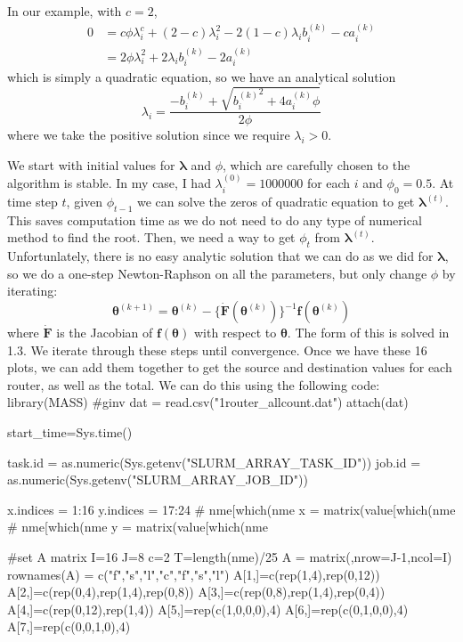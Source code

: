 \documentclass[letterpaper,10pt]{amsart}
\newenvironment{verbatimcode}{\bigskip \scriptsize \verbatim}{\endverbatim \normalsize \bigskip}
\begin{document}
\begin{enumerate}[{1}.1]
In our example, with $c=2$, 
\begin{align*}
0 &= c \phi \lambda_i^c + (2-c)\lambda_i^2 - 2(1-c)\lambda_i b_i^{(k)} - c a_i^{(k)}\\
&= 2 \phi \lambda_i^2 + 2 \lambda_i b_i^{(k)} - 2a_i^{(k)}
\end{align*}
which is simply a quadratic equation, so we have an analytical solution
\[\lambda_i = \frac{-b_i^{(k)} + \sqrt{{b_i^{(k)}}^2 + 4a_i^{(k)} \phi}}{2\phi} \]
where we take the positive solution since we require $\lambda_i>0$.

We start with initial values for $\boldsymbol \lambda$ and $\phi$, which are carefully chosen to the algorithm is stable. In my case, I had $\lambda_i^{(0)} = 1000000$ for each $i$ and $\phi_0=0.5$. At time step $t$, given $\phi_{t-1}$ we can solve the zeros of quadratic equation to get $\boldsymbol \lambda^{(t)}$. This saves computation time as we do not need to do any type of numerical method to find the root. Then, we need a way to get $\phi_t$ from $\boldsymbol \lambda^{(t)}$. Unfortunlately, there is no easy analytic solution that we can do as we did for $\boldsymbol \lambda$, so we do a one-step Newton-Raphson on all the parameters, but only change $\phi$ by iterating:
\[\boldsymbol \theta^{(k+1)} = \boldsymbol \theta^{(k)} - \{\dot{\boldsymbol F}(\boldsymbol \theta^{(k)})\}^{-1} \boldsymbol f(\boldsymbol \theta^{(k)}) \]
where $\dot{\boldsymbol F}$ is the Jacobian of $\boldsymbol f(\boldsymbol \theta)$ with respect to $\boldsymbol \theta$. The form of this is solved in 1.3. We iterate through these steps until convergence. Once we have these 16 plots, we can add them together to get the source and destination values for each router, as well as the total. We can do this using the following code: 
\begin{verbatimcode}
library(MASS) #ginv
dat = read.csv("1router_allcount.dat")
attach(dat)

start_time=Sys.time()

task.id = as.numeric(Sys.getenv("SLURM_ARRAY_TASK_ID"))
job.id = as.numeric(Sys.getenv("SLURM_ARRAY_JOB_ID"))

x.indices = 1:16
y.indices = 17:24
# nme[which(nme %
x = matrix(value[which(nme %
# nme[which(nme %
y = matrix(value[which(nme %

#set A matrix
I=16
J=8
c=2
T=length(nme)/25
A = matrix(,nrow=J-1,ncol=I)
rownames(A) = c("f","s","l","c","f","s","l")
A[1,]=c(rep(1,4),rep(0,12))
A[2,]=c(rep(0,4),rep(1,4),rep(0,8))
A[3,]=c(rep(0,8),rep(1,4),rep(0,4))
A[4,]=c(rep(0,12),rep(1,4))
A[5,]=rep(c(1,0,0,0),4)
A[6,]=rep(c(0,1,0,0),4)
A[7,]=rep(c(0,0,1,0),4)


\end{verbatimcode}
\end{enumerate}
\end{document}
